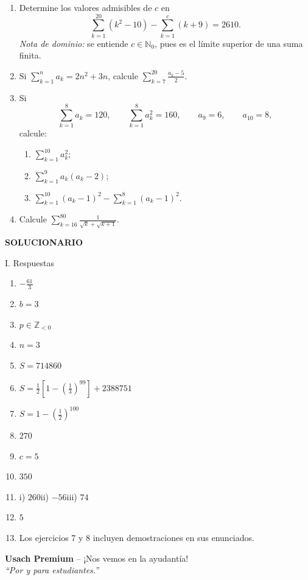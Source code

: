 \documentclass[letterpaper,12pt,twoside]{article}
\newcommand{\N}{\mathbb{N}}
\newcommand{\Z}{\mathbb{Z}}
\begin{document}
\begin{enumerate}[label=\textbf{\arabic*)},leftmargin=*,itemsep=1.1em]
\item Determine los valores admisibles de $c$ en
\[\sum_{k=1}^{20}(k^2-10)-\sum_{k=1}^{c}(k+9)=2610.\]
\textit{Nota de dominio:} se entiende $c\in\N_0$, pues es el límite superior de una suma finita.

\item Si $\displaystyle\sum_{k=1}^{n}a_k=2n^2+3n$, calcule
$\displaystyle\sum_{k=7}^{20}\frac{a_k-5}{2}$.

\item Si
\[\sum_{k=1}^{8}a_k=120,\qquad \sum_{k=1}^{8}a_k^2=160,
\qquad a_9=6,\qquad a_{10}=8,\]
calcule:
\begin{enumerate}[label=\roman*),itemsep=0.25em]
  \item $\displaystyle\sum_{k=1}^{10}a_k^2$;
  \item $\displaystyle\sum_{k=1}^{9}a_k(a_k-2)$;
  \item $\displaystyle\sum_{k=1}^{10}(a_k-1)^2-\sum_{k=1}^{8}(a_k-1)^2$.
\end{enumerate}

\item Calcule $\displaystyle\sum_{k=16}^{80}\frac1{\sqrt{k}+\sqrt{k+1}}$.
\end{enumerate}

\clearpage
\thispagestyle{fancy}
\vspace*{0.2cm}
\begin{center}
\begin{tcolorbox}[colback=azulFuerte,colframe=azulFuerte,colupper=white,
  width=0.8\textwidth,arc=10pt]
\centering\Large\bfseries SOLUCIONARIO
\end{tcolorbox}
\end{center}

\begin{solutionbox}{I. Respuestas}
\begin{enumerate}[label=\color{azulFuerte}\bfseries\arabic*),leftmargin=*,itemsep=0.55em]
  \item $\displaystyle -\frac{61}{3}$
  \item $b=3$
  \item $p\in\Z_{<0}$
  \item $n=3$
  \item $S=714860$
  \item $\displaystyle S=\frac12\left[1-\left(\frac13\right)^{99}\right]+2388751$
  \item[8)] $\displaystyle S=1-\left(\frac12\right)^{100}$
  \item[9)] $270$
  \item[10)] $c=5$
  \item[11)] $350$
  \item[12)] i) $260$\quad ii) $-56$\quad iii) $74$
  \item[13)] $5$
  \item[Nota:] Los ejercicios 7 y 8 incluyen demostraciones en sus enunciados.
\end{enumerate}
\end{solutionbox}

\begin{center}
\small\textbf{Usach Premium} -- ¡Nos vemos en la ayudantía!\\
\textit{``Por y para estudiantes.''}
\end{center}
\thispagestyle{fancy}
\end{document}

